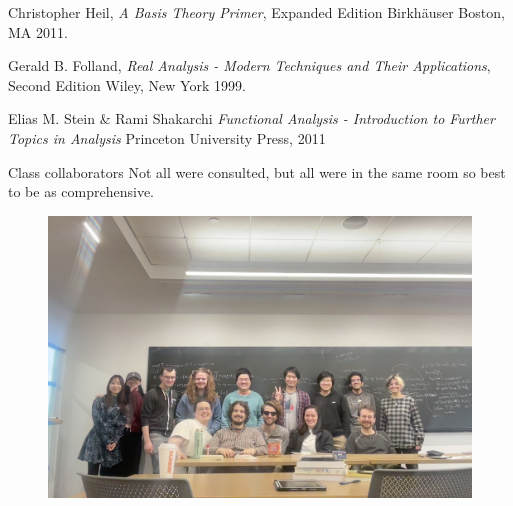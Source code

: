\documentclass[10pt]{article}
\begin{document}
\begin{thebibliography}{999}

  Christopher Heil,
  \emph{A Basis Theory Primer},
  Expanded Edition
  Birkhäuser Boston, MA
  2011.
  
  Gerald B. Folland,
  \emph{Real Analysis - Modern Techniques and Their Applications},
  Second Edition
  Wiley, New York
  1999.

  Elias M. Stein \& Rami Shakarchi
  \emph{Functional Analysis - Introduction to Further Topics in Analysis}
  Princeton University Press,
  2011

  Class collaborators
  Not all were consulted, but all were in the same room so best to be as comprehensive.
  \begin{figure}
    \includegraphics[width=\paperwidth]{FuNtional exam group}
  \end{figure}
  
  

\end{thebibliography}
\end{document}
